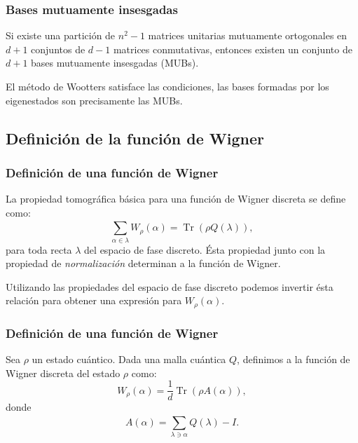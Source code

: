 \documentclass[10pt, spanish]{beamer}
\DeclareMathOperator{\Tr}{Tr}
\begin{document}
  \begin{frame}
    \frametitle{Bases mutuamente insesgadas}

    \begin{theorem}[Bandyophyay et al]
      Si existe una partición de $n^2-1$ matrices unitarias
      mutuamente ortogonales en $d+1$ conjuntos de $d-1$ 
      matrices conmutativas, entonces existen un conjunto de
      $d+1$ bases mutuamente insesgadas (MUBs).
    \end{theorem} 

    \vspace{15pt}

    El método de Wootters satisface las condiciones, las
    bases formadas por los eigenestados son precisamente las
    MUBs.
  \end{frame}

  \subsection{Definición de la función de Wigner}

  \begin{frame}
    \frametitle{Definición de una función de Wigner}

    La propiedad tomográfica básica para una función de
    Wigner discreta se define como:
    \begin{equation}
      \sum_{\alpha \in \lambda}^{} W_\rho(\alpha)
      = \Tr\left( \rho Q(\lambda) \right),
    \end{equation}
    para toda recta $\lambda$ del espacio de fase discreto.
    Ésta propiedad junto con la propiedad de
    \textit{normalización} determinan a la función de
    Wigner.

    \vspace{15pt}

    Utilizando las propiedades del espacio de fase
    discreto podemos invertir ésta relación para obtener una
    expresión para $W_\rho(\alpha)$.
  \end{frame}

  \begin{frame}
    \frametitle{Definición de una función de Wigner}

    \begin{definition}
      Sea $\rho$ un estado cuántico. Dada una malla cuántica
      $Q$, definimos a la función de Wigner discreta del
      estado $\rho$ como:
      \begin{equation}
        W_\rho(\alpha)
        = \frac{1}{d} \Tr\left( \rho A(\alpha) \right),
      \end{equation}
      donde
      \begin{equation}
        A(\alpha)
        = \sum_{\lambda \ni \alpha}^{} Q(\lambda) - I.
      \end{equation}
    \end{definition}
  \end{frame}
\end{document}
